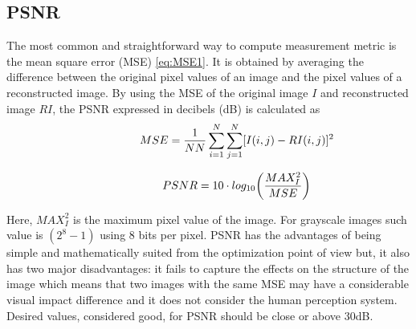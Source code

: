 \FloatBarrier

\subsection{PSNR} 
The most common and straightforward way to compute measurement metric is the mean square error (MSE) \ref{eq:MSE1}. It is obtained by averaging the difference between the original pixel values of an image and the pixel values of a reconstructed image. By using the MSE of the original image $I$ and reconstructed image $RI$, the PSNR expressed in decibels (dB) is calculated as
\begin{equation} \label{eq:mse1}
\centering
\hspace{3em} \hspace{3em} \hspace{3em} MSE = \frac{1}{NN} \sum\limits_{i=1}^N \sum\limits_{j=1}^N [ I( i , j) - RI ( i , j ) ]^2    \enspace \enspace \hspace{3em}
\end{equation} 

\begin{equation} \label{eq:LS1}
\centering
\hspace{3em} \hspace{3em} \hspace{3em} PSNR = 10 \cdot log_{10} \bigg( \frac{ MAX_{I}^{2} }{MSE} \bigg) \enspace \enspace \hspace{3em}
\end{equation} 

Here, $MAX_{I}^{2}$ is the maximum pixel value of the image. For grayscale images such value is $(2^8 - 1)$ using 8 bits per pixel. PSNR has the advantages of being simple and mathematically suited from the optimization point of view but, it also has two major disadvantages: it fails to capture the effects on the structure of the image which means that two images with the same MSE may have a considerable visual impact difference and it does not consider the human perception system. Desired values, considered good, for PSNR should be close or above 30dB. 

\FloatBarrier

